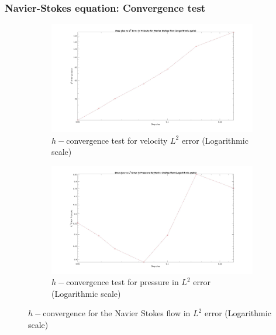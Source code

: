 \documentclass{beamer}
\begin{document}
\begin{frame}
\frametitle{Navier-Stokes equation: Convergence test}
\begin{figure}
\begin{subfigure}{0.4\textwidth}	
  \includegraphics[width=\linewidth]{L2_convergence_velocity_n_s_log.jpg}
  \caption{$h-$convergence test for velocity $L^2$ error (Logarithmic scale)}
  \label{fig:vel_naviers_stoke_conv_log}
\end{subfigure}
\begin{subfigure}{0.4\textwidth}	
  \includegraphics[width=\linewidth]{L2_convergence_pressure_n_s_log.jpg}
  \caption{$h-$convergence test for pressure in $L^2$ error (Logarithmic scale)}
  \label{fig:pre_navier_stoke_conv_log}
\end{subfigure}
\caption{$h-$convergence for the Navier Stokes flow in $L^2$ error (Logarithmic scale)}
\label{navier_stoke_conv_l2_log}
\end{figure}
\end{frame}
\end{document}
